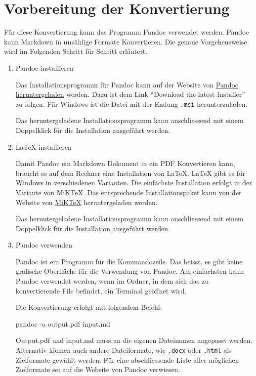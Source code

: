 \documentclass[
  nswissgerman,
  a4paper,
  DIV=11,
  numbers=noendperiod,
  ngerman]{scrreprt}
\newenvironment{Shaded}{\begin{snugshade}}{\end{snugshade}}
\newcommand{\AttributeTok}[1]{\textcolor[rgb]{0.40,0.45,0.13}{#1}}
\newcommand{\ExtensionTok}[1]{\textcolor[rgb]{0.00,0.23,0.31}{#1}}
\newcommand{\NormalTok}[1]{\textcolor[rgb]{0.00,0.23,0.31}{#1}}
\begin{document}
\section{Vorbereitung der
Konvertierung}\label{vorbereitung-der-konvertierung}

Für diese Konvertierung kann das Programm Pandoc verwendet werden.
Pandoc kann Markdown in unzählige Formate Konvertieren. Die genaue
Vorgehensweise wird im Folgenden Schritt für Schritt erläutert.

\begin{enumerate}
\def\labelenumi{\arabic{enumi}.}
\item
  Pandoc installieren

  Das Installationsprogramm für Pandoc kann auf der Website von
  \href{https://pandoc.org/installing.html}{Pandoc heruntergeladen}
  werden. Dazu ist dem Link ``Download the latest Installer'' zu folgen.
  Für Windows ist die Datei mit der Endung \texttt{.msi}
  herunterzuladen.

  Das heruntergeladene Installationsprogramm kann anschliessend mit
  einem Doppelklick für die Installation ausgeführt werden.
\item
  LaTeX installieren

  Damit Pandoc ein Markdown Dokument in ein PDF Konvertieren kann,
  braucht es auf dem Rechner eine Installation von LaTeX. LaTeX gibt es
  für Windows in verschiedenen Varianten. Die einfachste Installation
  erfolgt in der Variante von MiKTeX. Das entsprechende
  Installationspaket kann von der Website von
  \href{https://miktex.org/download}{MiKTeX} heruntergeladen werden.

  Das heruntergeladene Installationsprogramm kann anschliessend mit
  einem Doppelklick für die Installation ausgeführt werden.
\item
  Pandoc verwenden

  Pandoc ist ein Programm für die Kommandozeile. Das heisst, es gibt
  keine grafische Oberfläche für die Verwendung von Pandoc. Am
  einfachsten kann Pandoc verwendet werden, wenn im Ordner, in dem sich
  das zu konvertierende File befindet, ein Terminal geöffnet wird.

  Die Konvertierung erfolgt mit folgendem Befehl:

\begin{Shaded}
\begin{Highlighting}[numbers=left,,]
\ExtensionTok{pandoc} \AttributeTok{{-}o}\NormalTok{ output.pdf input.md}
\end{Highlighting}
\end{Shaded}

  Output.pdf und input.md muss an die eigenen Dateinamen angepasst
  werden. Alternativ können auch andere Dateiformate, wie \texttt{.docx}
  oder \texttt{.html} als Zielformate gewählt werden. Für eine
  abschliessende Liste aller möglichen Zielformate sei auf die Website
  von Pandoc verwiesen.
\end{enumerate}
\end{document}
